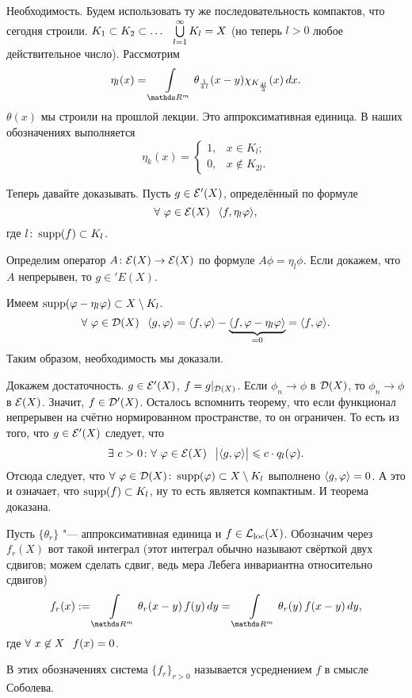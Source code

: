 \begin{Proof}
	Необходимость. Будем использовать ту же последовательность компактов, что сегодня строили. $K_1\subset K_2\subset\dots\pau \uN l1 K_l=X$ (но теперь $l>0$ любое действительное число). Рассмотрим
	\[
		\eta_l(x) = \Gint{\R^m}\theta_{\frac1{4\,l}}(x-y)\chi_{K_{\frac{4l}3}}(x)\,dx.
	\]
	$\theta(x)$ мы строили на прошлой лекции. Это аппроксимативная единица. В наших обозначениях выполняется
	\[
  \eta_k(x) = \begin{cases}
	  1,&x\in K_l;\\
	  0,&x\not\in K_{2l}.
  \end{cases}
	\]

	Теперь давайте доказывать. Пусть $g\in \mathcal E'(X)$, определённый по формуле
	\[
 \forall\ \phi\in\E(X)\pau \la f,\eta_l\phi\ra,
	\]
	где $l\colon \operatorname{supp}(f)\subset K_l$.

	Определим оператор $A\colon \mathcal E(X)\rightarrow\mathcal E(X)$ по формуле $A\phi = \eta_l\phi$. Если докажем, что $A$ непрерывен, то $g\in 'E(X)$.

	Имеем $\operatorname{supp}(\varphi-\eta_l\varphi)\subset X\setminus K_l$.
\[
\forall\ \varphi\in\mathcal D(X)\hskip .75em plus.1em minus.08em\relax  \langle g,\varphi\rangle = \langle f,\varphi\rangle - \underbrace{\langle f,\varphi-\eta_l\varphi\rangle}_{=0} = \langle f,\varphi\rangle.
\]
Таким образом, необходимость мы доказали.

Докажем достаточность. $g\in \mathcal E'(X)$, $f = g|_{\mathcal D(X)}$. Если $\phi_n\to\phi$ в $\mathcal D(X)$, то $\phi_n\to\phi$ в $\mathcal E(X)$. Значит, $f\in\mathcal D'(X)$. 
Осталось вспомнить теорему, что если функционал непрерывен на счётно нормированном пространстве, то он ограничен. То есть из того, что $g\in\mathcal E'(X)$ следует, что
\[
  \exists\ c>0\colon \forall\ \varphi\in\mathcal E(X)\hskip .75em plus.1em minus.08em\relax \big|\langle g,\varphi\rangle\big|\leqslant c\cdot q_l(\varphi).
\]
Отсюда следует, что $\forall\ \varphi\in\mathcal D(X)\colon \operatorname{supp}(\varphi)\subset X\setminus K_l$ выполнено $\langle g,\varphi\rangle = 0$. А это и означает, что $\operatorname{supp}(f)\subset K_l$, ну то есть является компактным. И теорема доказана.
\end{Proof}
\begin{Def}
	Пусть $\{\theta_r\}$ "--- аппроксимативная единица и $f\in \mathcal L_{\mathrm{loc}}(X)$. Обозначим через $f_r(X)$ вот такой интеграл (этот интеграл обычно называют свёрткой двух сдвигов; можем сделать сдвиг, ведь мера Лебега инвариантна относительно сдвигов)
	\[
		f_r(x) := \Gint{\R^m}\theta_r(x-y)\,f(y)\,dy = 
		\Gint{\R^m}\theta_r(y)\,f(x-y)\,dy,
	\]
	где $\forall\ x\not\in X\pau f(x)=0$.

	В этих обозначениях система $\{f_r\}_{r>0}$ называется усреднением $f$ в смысле Соболева.
\end{Def}

